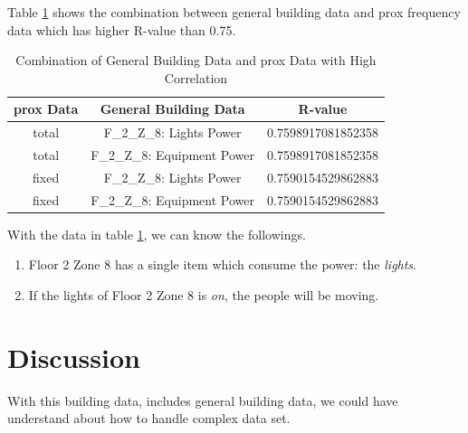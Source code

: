 \documentclass[aps, 10pt, a4paper]{article}
\begin{document}
                Table \ref{tb:correlationprox} shows the combination between general building data and prox frequency data which has higher R-value than 0.75. 
                
                \begin{table}[htbp]
                    \centering
                    \caption{Combination of General Building Data and prox Data with High Correlation}
                    \label{tb:correlationprox}
                    \begin{tabular}{cc|c}
                        prox Data & General Building Data & R-value \\ \hline
                        total & F\_2\_Z\_8: Lights Power & 0.7598917081852358 \\
                        total & F\_2\_Z\_8: Equipment Power & 0.7598917081852358 \\
                        fixed & F\_2\_Z\_8: Lights Power & 0.7590154529862883 \\
                        fixed & F\_2\_Z\_8: Equipment Power & 0.7590154529862883 \\
                    \end{tabular}
                \end{table}
            
                With the data in table \ref{tb:correlationprox}, we can know the followings. 
                
                \begin{enumerate}
                    \item Floor 2 Zone 8 has a single item which consume the power: the \textit{lights}.
                    \item If the lights of Floor 2 Zone 8 is \textit{on}, the people will be moving.
                \end{enumerate}
    
    \section{Discussion}
        With this building data, includes general building data, we could have understand about how to handle complex data set. 
    
    
    
\end{document}
